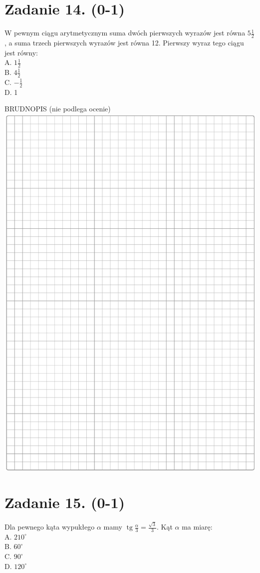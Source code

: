 \documentclass[10pt]{article}
\begin{document}
\section*{Zadanie 14. (0-1)}
W pewnym ciągu arytmetycznym suma dwóch pierwszych wyrazów jest równa \(5 \frac{1}{2}\), a suma trzech pierwszych wyrazów jest równa 12. Pierwszy wyraz tego ciągu jest równy:\\
A. \(1 \frac{1}{2}\)\\
B. \(4 \frac{1}{2}\)\\
C. \(-\frac{1}{2}\)\\
D. 1

BRUDNOPIS (nie podlega ocenie)\\
\includegraphics[max width=\textwidth, center]{2024_11_21_724abc2cf5a71562f5b2g-05}

\section*{Zadanie 15. (0-1)}
Dla pewnego kąta wypukłego \(\alpha\) mamy \(\operatorname{tg} \frac{\alpha}{3}=\frac{\sqrt{3}}{3}\). Kąt \(\alpha\) ma miarę:\\
A. \(210^{\circ}\)\\
B. \(60^{\circ}\)\\
C. \(90^{\circ}\)\\
D. \(120^{\circ}\)
\end{document}
